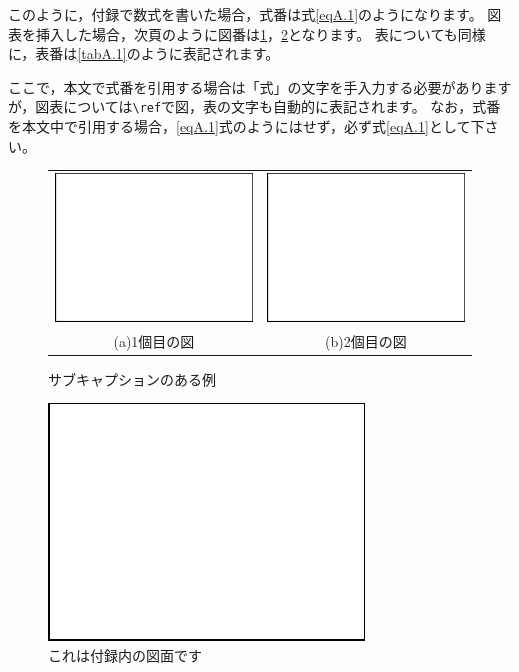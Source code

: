 \begin{Appendix}
\noindent
このように，付録で数式を書いた場合，式番は式\ref{eqA.1}のようになります。
図表を挿入した場合，次頁のように図番は\ref{figA.3}，\ref{figA.4}となります。
表についても同様に，表番は\ref{tabA.1}のように表記されます。

ここで，本文で式番を引用する場合は「式」の文字を手入力する必要がありますが，図表については\verb|\ref|で図，表の文字も自動的に表記されます。
なお，式番を本文中で引用する場合，\ref{eqA.1}式のようにはせず，必ず式\ref{eqA.1}として下さい。
\begin{figure}[tbhp]
\hfil
\begin{tabular}{cc}
\includegraphics{square.eps} &
\includegraphics{square.eps} \\
(a)\hspace{1zw}1個目の図 &
(b)\hspace{1zw}2個目の図
\end{tabular}
\caption{サブキャプションのある例}
\label{figA.3}
\end{figure}

\begin{figure}[tbhp]
\hfil
\includegraphics{square.eps}
\caption{これは付録内の図面です}
\label{figA.4}
\end{figure}


\end{Appendix}
